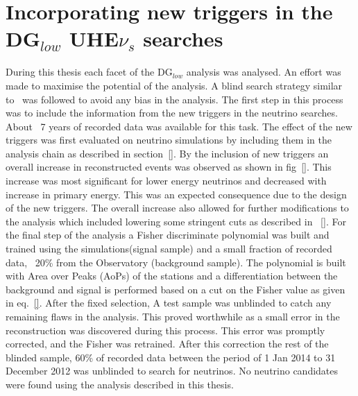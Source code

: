 \section*{Incorporating new triggers in the DG$_{low}$ UHE$\nu_s$ searches}
During this thesis each facet of the DG$_{low}$ analysis was analysed. An effort was made to maximise the potential of the analysis. A blind search strategy similar to~\cite{} was followed to avoid any bias in the analysis. The first step in this process was to include the information from the new triggers in the neutrino searches. About ~7 years of recorded data was available for this task. The effect of the new triggers was first evaluated on neutrino simulations by including them in the analysis chain as described in section~\ref{}. By the inclusion of new triggers an overall increase in reconstructed events was observed as shown in fig~\ref{}. This increase was most significant for lower energy neutrinos and decreased with increase in primary energy. This was an expected consequence due to the design of the new triggers. The overall increase also allowed for further modifications to the analysis which included lowering some stringent cuts as described in ~\ref{}. For the final step of the analysis a Fisher discriminate polynomial was built and trained using the simulations(signal sample) and a small fraction of recorded data, ~20\% from the Observatory (background sample). The polynomial is built with Area over Peaks (AoPs) of the stations and a differentiation between the background and signal is performed based on a cut on the Fisher value as given in eq.~\ref{}. 
After the fixed selection, A test sample was unblinded to catch any remaining flaws in the analysis. This proved worthwhile as a small error in the reconstruction was discovered during this process. This error was promptly corrected, and the Fisher was retrained. After this correction the rest of the blinded sample, 60\% of recorded data between the period of 1 Jan 2014 to 31 December 2012 was unblinded to search for neutrinos. No neutrino candidates were found using the analysis described in this thesis. 

